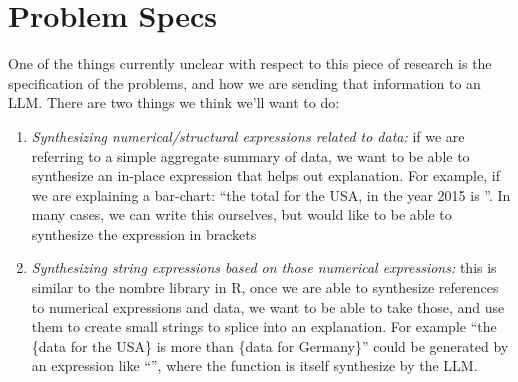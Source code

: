 \section{Problem Specs}
One of the things currently unclear with respect to this piece of research is the
specification of the problems, and how we are sending that information to an LLM.
There are two things we think we'll want to do:
\begin{enumerate}
   \item \textit{Synthesizing numerical/structural expressions related to data:} if we are referring to a simple aggregate summary of data, we want to be able to synthesize an in-place expression that helps out explanation. For example, if we are explaining a bar-chart: ``the total for the USA, in the year 2015 is ''. In many cases, we can write this ourselves, but would like to be able to synthesize the expression in brackets
   \item \textit{Synthesizing string expressions based on those numerical expressions:} this is similar to the nombre library in R, once we are able to synthesize references to numerical expressions and data, we want to be able to take those, and use them to create small strings to splice into an explanation. For example ``the \{data for the USA\} is more than \{data for Germany\}'' could be generated by an expression like ``'', where the function  is itself synthesize by the LLM.
\end{enumerate}